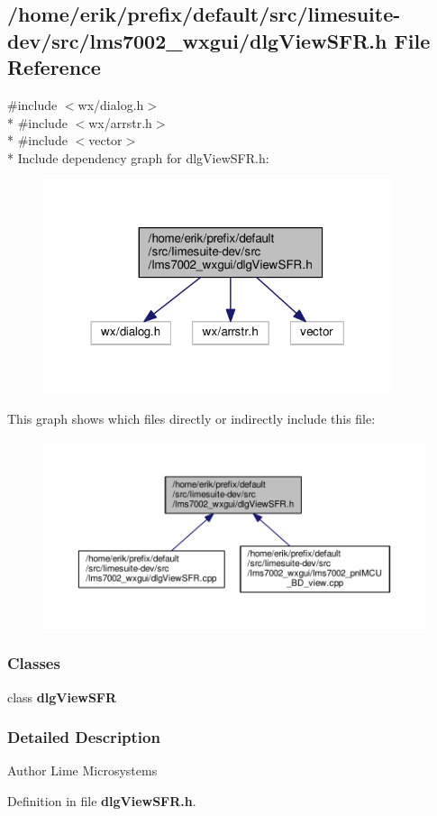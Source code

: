 \subsection{/home/erik/prefix/default/src/limesuite-\/dev/src/lms7002\+\_\+wxgui/dlg\+View\+S\+FR.h File Reference}
\label{dlgViewSFR_8h}
{\ttfamily \#include $<$wx/dialog.\+h$>$}\\*
{\ttfamily \#include $<$wx/arrstr.\+h$>$}\\*
{\ttfamily \#include $<$vector$>$}\\*
Include dependency graph for dlg\+View\+S\+F\+R.\+h\+:
\nopagebreak
\begin{figure}[H]
\begin{center}
\leavevmode
\includegraphics[width=290pt]{d7/dd8/dlgViewSFR_8h__incl}
\end{center}
\end{figure}
This graph shows which files directly or indirectly include this file\+:
\nopagebreak
\begin{figure}[H]
\begin{center}
\leavevmode
\includegraphics[width=350pt]{d9/dc8/dlgViewSFR_8h__dep__incl}
\end{center}
\end{figure}
\subsubsection*{Classes}
\begin{DoxyCompactItemize}
\item 
class {\bf dlg\+View\+S\+FR}
\end{DoxyCompactItemize}


\subsubsection{Detailed Description}
\begin{DoxyAuthor}{Author}
Lime Microsystems 
\end{DoxyAuthor}


Definition in file {\bf dlg\+View\+S\+F\+R.\+h}.

